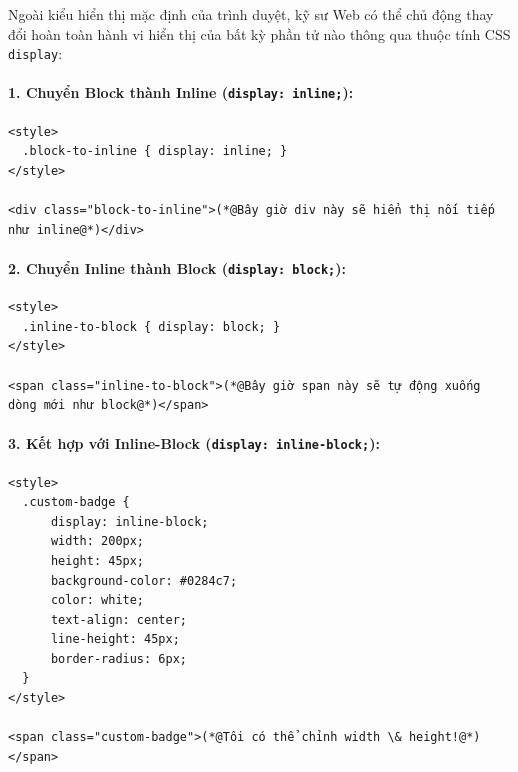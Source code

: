 \documentclass[11pt,oneside]{book}
\newcommand{\codeinline}[1]{\textcolor{accentOrange}{\texttt{#1}}}
\begin{document}
Ngoài kiểu hiển thị mặc định của trình duyệt, kỹ sư Web có thể chủ động thay đổi hoàn toàn hành vi hiển thị của bất kỳ phần tử nào thông qua thuộc tính CSS \codeinline{display}:

\paragraph{1. Chuyển Block thành Inline (\codeinline{display: inline;}):}
\begin{codeWindow}
\begin{lstlisting}[language=HTML5]
<style>
  .block-to-inline { display: inline; }
</style>

<div class="block-to-inline">(*@Bây giờ div này sẽ hiển thị nối tiếp như inline@*)</div>
\end{lstlisting}
\end{codeWindow}

\paragraph{2. Chuyển Inline thành Block (\codeinline{display: block;}):}
\begin{codeWindow}
\begin{lstlisting}[language=HTML5]
<style>
  .inline-to-block { display: block; }
</style>

<span class="inline-to-block">(*@Bây giờ span này sẽ tự động xuống dòng mới như block@*)</span>
\end{lstlisting}
\end{codeWindow}

\paragraph{3. Kết hợp với Inline-Block (\codeinline{display: inline-block;}):}
\begin{codeWindow}
\begin{lstlisting}[language=HTML5]
<style>
  .custom-badge {
      display: inline-block;
      width: 200px;
      height: 45px;
      background-color: #0284c7;
      color: white;
      text-align: center;
      line-height: 45px;
      border-radius: 6px;
  }
</style>

<span class="custom-badge">(*@Tôi có thể chỉnh width \& height!@*)</span>
\end{lstlisting}
\end{codeWindow}
\end{document}

